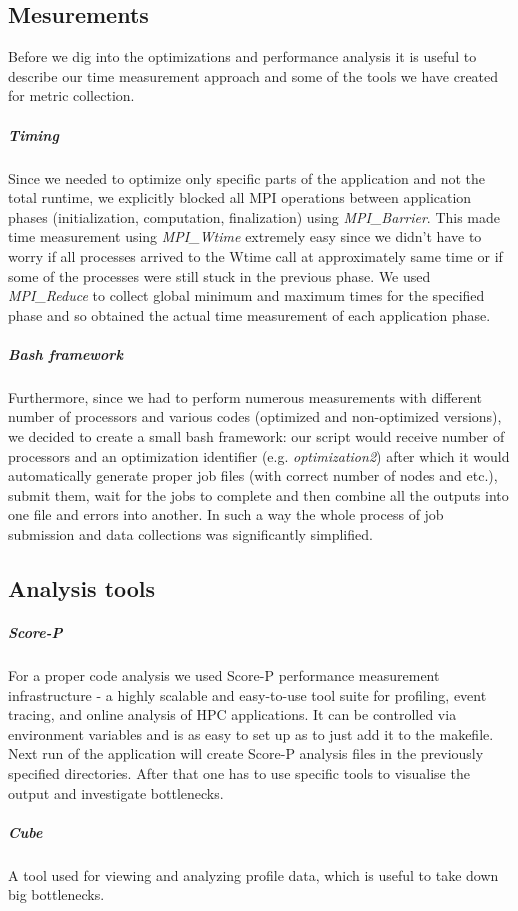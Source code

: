 \documentclass{article}
\begin{document}
\subsection{Mesurements}
Before we dig into the optimizations and performance analysis it is useful to describe our time measurement approach and some of the tools we have created for metric collection. 

\subparagraph{Timing}
Since we needed to optimize only specific parts of the application and not the total runtime, we explicitly blocked all MPI operations between application phases (initialization, computation, finalization) using \textit{MPI\_Barrier}. This made time measurement using \textit{MPI\_Wtime} extremely easy since we didn't have to worry if all processes arrived to the Wtime call at approximately same time or if some of the processes were still stuck in the previous phase. We used \textit{MPI\_Reduce} to collect global minimum and maximum times for the specified phase and so obtained the actual time measurement of each application phase.

\subparagraph{Bash framework}
Furthermore, since we had to perform numerous measurements with different number of processors and various codes (optimized and non-optimized versions), we decided to create a small bash framework: our script would receive number of processors and an optimization identifier (e.g. \textit{optimization2}) after which it would automatically generate proper job files (with correct number of nodes and etc.), submit them, wait for the jobs to complete and then combine all the outputs into one file and errors into another. In such a way the whole process of job submission and data collections was significantly simplified.

\subsection{Analysis tools}

\subparagraph{Score-P}
For a proper code analysis we used Score-P performance measurement infrastructure - a highly scalable and easy-to-use tool suite for profiling, event tracing, and online analysis of HPC applications. It can be controlled via environment variables and is as easy to set up as to just add it to the makefile. Next run of the application will create Score-P analysis files in the previously specified directories. After that one has to use specific tools to visualise the output and investigate bottlenecks.

\subparagraph{Cube}
A tool used for viewing and analyzing profile data, which is useful to take down big bottlenecks. 
\end{document}
